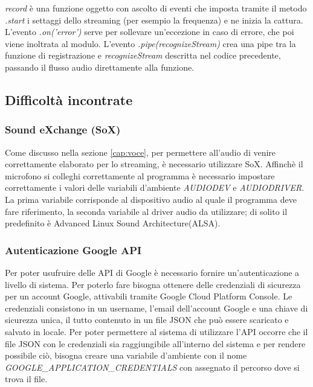 \emph{record} \`e una funzione oggetto con ascolto di eventi che
imposta tramite il metodo \emph{.start} i settaggi dello streaming (per esempio la frequenza) e ne inizia la cattura.
L'evento \emph{.on('error')} serve per sollevare un'eccezione in caso di errore, che poi viene inoltrata al modulo.
L'evento \emph{.pipe(recognizeStream)} crea una pipe tra la funzione di registrazione e \emph{recognizeStream} descritta nel codice precedente,
passando il flusso audio direttamente alla funzione.

\subsection{Difficolt\`a incontrate}
\subsubsection{Sound eXchange (SoX)}\label{cap:sox}
Come discusso nella sezione \ref{cap:voce}, per permettere all'audio di venire correttamente elaborato
per lo streaming, \`e necessario utilizzare SoX.
Affinch\`e il microfono si colleghi correttamente al programma \`e necessario impostare correttamente
i valori delle variabili d'ambiente \textit{AUDIODEV} e \textit{AUDIODRIVER}.
La prima variabile corrisponde al dispositivo audio al quale il programma deve fare riferimento,
la seconda variabile al driver audio da utilizzare; di solito il predefinito \`e Advanced Linux Sound Architecture(ALSA).

\subsubsection{Autenticazione Google API}\label{cap:google}
Per poter usufruire delle API di Google \`e necessario fornire un'autenticazione a livello
di sistema.
Per poterlo fare bisogna ottenere delle credenziali di sicurezza per un account Google,
attivabili tramite Google Cloud Platform Console.
Le credenziali consistono in un username, l'email dell'account Google e una chiave di sicurezza unica,
 il tutto contenuto in un file JSON che pu\`o essere scaricato e salvato in locale.
Per poter permettere al sistema di utilizzare l'API occorre che il file JSON con le credenziali sia
raggiungibile all'interno del sistema e per rendere possibile ci\`o, bisogna creare una variabile d'ambiente
con il nome \emph{GOOGLE\_APPLICATION\_CREDENTIALS} con assegnato il percorso dove si trova il file.

